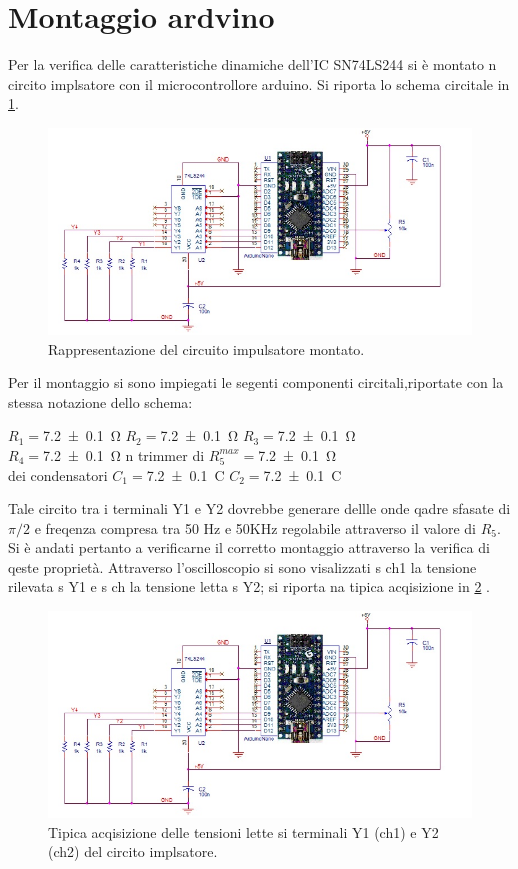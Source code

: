 \section{Montaggio ardvino}
	Per la verifica delle caratteristiche dinamiche dell'IC SN74LS244 si è montato n circito implsatore con il microcontrollore arduino.
	Si riporta lo schema circitale in \figurename{ \ref{f:impulsatore}}.

		\begin{figure}[htb]
			\includegraphics[scale=0.50]{imp.png}
			\caption{Rappresentazione del circuito impulsatore montato.}
			\label{f:impulsatore}
		\end{figure}
	Per il montaggio si sono impiegati le  segenti componenti circitali,riportate con la stessa notazione dello schema:
	\begin{center}
	\bigskip
		$R_{1}=$\SI{7.2 \pm 0.1}{\ohm} $R_{2}=$\SI{7.2 \pm 0.1}{\ohm} $R_{3}=$\SI{7.2 \pm 0.1}{\ohm} \\
		$R_{4}=$\SI{7.2 \pm 0.1}{\ohm} n trimmer di $R_{5}^{max}=$\SI{7.2 \pm 0.1}{\ohm} \\
 		dei condensatori	$C_{1}=$\SI{7.2 \pm 0.1}{\coulomb} $C_{2}=$\SI{7.2 \pm 0.1}{\coulomb}

	\end{center}
	Tale circito tra i terminali Y1 e Y2 dovrebbe generare dellle onde qadre sfasate di $\pi/2$ e freqenza compresa tra 50 Hz e 50KHz regolabile attraverso il valore di $R_{5}$.
	Si è andati pertanto a verificarne il corretto montaggio attraverso la verifica di qeste proprietà.
	Attraverso l'oscilloscopio si sono visalizzati s ch1 la tensione rilevata s Y1 e s  ch la tensione letta s Y2; si riporta na tipica acqisizione in
	\figurename{ \ref{f:oscil} } .
	\begin{figure}[htb]
		\includegraphics[scale=0.50]{imp.png}
		\caption{Tipica acqisizione delle tensioni lette si terminali Y1 (ch1) e Y2 (ch2) del circito implsatore.}
		\label{f:oscil}
	\end{figure}
